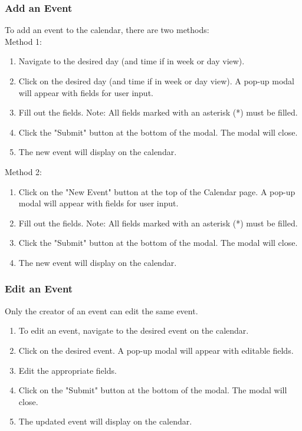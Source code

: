 \documentclass[12pt]{article}
\begin{document}
\subsubsection{Add an Event}
To add an event to the calendar, there are two methods: \\
Method 1:
\begin{enumerate}
\item Navigate to the desired day (and time if in week or day view).
\item Click on the desired day (and time if in week or day view). A pop-up modal will appear with fields for user input.
\item Fill out the fields. Note: All fields marked with an asterisk (*) must be filled.
\item Click the "Submit" button at the bottom of the modal. The modal will close.
\item The new event will display on the calendar.
\end{enumerate}
Method 2:
\begin{enumerate}
\item Click on the "New Event" button at the top of the Calendar page. A pop-up modal will appear with fields for user input.
\item Fill out the fields. Note: All fields marked with an asterisk (*) must be filled.
\item Click the "Submit" button at the bottom of the modal. The modal will close.
\item The new event will display on the calendar.
\end{enumerate}

\subsubsection{Edit an Event}
Only the creator of an event can edit the same event.
\begin{enumerate}
\item To edit an event, navigate to the desired event on the calendar.
\item Click on the desired event. A pop-up modal will appear with editable fields.
\item Edit the appropriate fields.
\item Click on the "Submit" button at the bottom of the modal. The modal will close.
\item The updated event will display on the calendar.
\end{enumerate}
\end{document}
